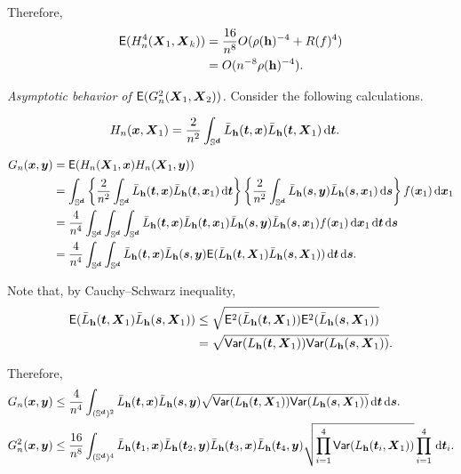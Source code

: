 \documentclass{article}
\begin{document}
Therefore,
\begin{align*}
    \mathsf{E} (H_n^4(\bX_1, \bX_k)) &= \frac{16}{n^{8}} O(\rho(\bh)^{-4} + R(f)^4) \\
    &= O(n^{-8} \rho(\bh)^{-4}).
\end{align*}

\textit{Asymptotic behavior of $\mathsf{E} (G_n^2(\bX_1,\bX_2))$.} Consider the following calculations.

\begin{align*}
    H_n(\bx,\bX_1) &= \frac{2}{n^2} \int_{\Sr} \bar{L}_{\bh} (\bt,\bx) \bar{L}_{\bh} (\bt,\bX_1) \,\rd \bt.
\end{align*}

\begin{align*}
    G_n(\bx,\by) &= \mathsf{E} (H_n(\bX_1,\bx)H_n(\bX_1,\by))\\
    &=\int_{\Sr} \lrb{\frac{2}{n^2} \int_{\Sr} \bar{L}_{\bh} (\bt,\bx) \bar{L}_{\bh} (\bt,\bx_1) \,\rd \bt} \lrb{\frac{2}{n^2} \int_{\Sr} \bar{L}_{\bh} (\bs,\by) \bar{L}_{\bh} (\bs,\bx_1) \,\rd \bs} f(\bx_1) \,\rd \bx_1 \\
    &= \frac{4}{n^4} \int_{\Sr} \int_{\Sr} \int_{\Sr} \bar{L}_{\bh} (\bt,\bx) \bar{L}_{\bh} (\bt,\bx_1) \bar{L}_{\bh} (\bs,\by) \bar{L}_{\bh} (\bs,\bx_1) f(\bx_1) \,\rd \bx_1 \,\rd \bt \,\rd \bs \\
    &= \frac{4}{n^4} \int_{\Sr} \int_{\Sr} \bar{L}_{\bh} (\bt,\bx) \bar{L}_{\bh} (\bs,\by) \mathsf{E} (\bar{L}_{\bh} (\bt,\bX_1) \bar{L}_{\bh} (\bs,\bX_1)) \,\rd \bt \,\rd \bs.
\end{align*}

Note that, by Cauchy--Schwarz inequality,
\begin{align*}
    \mathsf{E} (\bar{L}_{\bh} (\bt,\bX_1) \bar{L}_{\bh} (\bs,\bX_1)) & \le \sqrt{\mathsf{E}^2 (\bar{L}_{\bh} (\bt,\bX_1)) \mathsf{E}^2 (\bar{L}_{\bh} (\bs,\bX_1))} \\
    &= \sqrt{\mathsf{Var} ({L}_{\bh} (\bt,\bX_1)) \mathsf{Var} ({L}_{\bh} (\bs,\bX_1))}.
\end{align*}

Therefore,
\begin{align*}
    G_n(\bx,\by) & \le \frac{4}{n^4} \int_{(\Sr)^2}  \bar{L}_{\bh} (\bt,\bx) \bar{L}_{\bh} (\bs,\by) \sqrt{\mathsf{Var} ({L}_{\bh} (\bt,\bX_1)) \mathsf{Var} ({L}_{\bh} (\bs,\bX_1))} \,\rd \bt \,\rd \bs. \\
    G_n^2(\bx,\by) & \le \frac{16}{n^{8}} \int_{(\Sr)^4} \bar{L}_{\bh} (\bt_1,\bx) \bar{L}_{\bh} (\bt_2,\by) \bar{L}_{\bh} (\bt_3,\bx) \bar{L}_{\bh} (\bt_4,\by) \sqrt{\prod_{i=1}^{4} \mathsf{Var} ({L}_{\bh} (\bt_i,\bX_1)) } \prod_{i=1}^{4} \,\rd \bt_i.
\end{align*}
\end{document}
